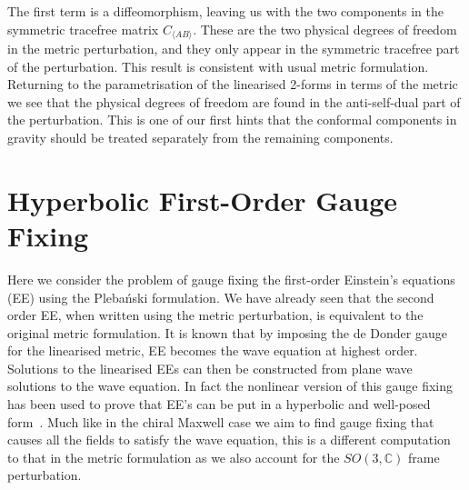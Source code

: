 \documentclass[10pt]{report}
\newcommand{\pleb}[0]{Pleba\'nski}
\theoremstyle{definition}
\newcommand{\C}[0]{\mathbb{C}}
\begin{document}
The first term is a diffeomorphism, leaving us with the two components in the symmetric tracefree matrix $C_{\langle  AB \rangle}$. These are the two physical degrees of freedom in the metric perturbation, and they only appear in the symmetric tracefree part of the perturbation. This result is consistent with usual metric formulation. Returning to the parametrisation of the linearised 2-forms in terms of the metric we see that the physical degrees of freedom are found in the anti-self-dual part of the perturbation. This is one of our first hints that the conformal components in gravity should be treated separately from the remaining components.

\section{Hyperbolic First-Order Gauge Fixing}
    Here we consider the problem of gauge fixing the first-order Einstein's equations (EE) using the \pleb{} formulation. We have already seen that the second order EE, when written using the metric perturbation, is equivalent to the original metric formulation. It is known that by imposing the de Donder gauge for the linearised metric, EE becomes the wave equation at highest order. Solutions to the linearised EEs can then be constructed from plane wave solutions to the wave equation. In fact the nonlinear version of this gauge fixing has been used to prove that EE's can be put in a hyperbolic and well-posed form~\cite{Hyperb1+3YvonneTommaso1983}. Much like in the chiral Maxwell case we aim to find gauge fixing that causes all the fields to satisfy the wave equation, this is a different computation to that in the metric formulation as we also account for the $SO(3,\C)$ frame perturbation.
\end{document}
